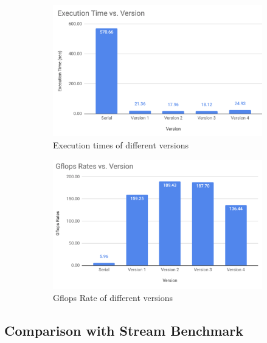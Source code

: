 \documentclass{article}
\begin{document}
\begin{figure}[!htb]
  \centering
  \begin{subfigure}{.45\textwidth}
      \centering
      \includegraphics[width=1\linewidth]{./img/execution-version.png}
      \caption{Execution times of different versions}
  \end{subfigure} 
  \begin{subfigure}{.45\textwidth}
      \centering
      \includegraphics[width=1\linewidth]{./img/gflops-version.png}
      \caption{Gflops Rate of different versions}
  \end{subfigure}
  \caption{}
\end{figure}   

\newpage
\subsection{Comparison with Stream Benchmark}
\end{document}
